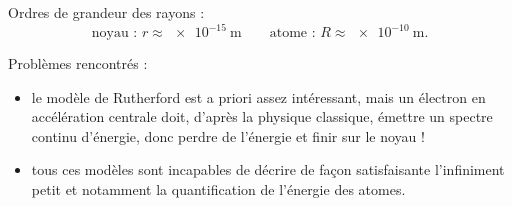 Ordres de grandeur des rayons : \[\text{noyau : }r\approx\SI{e-15}{\meter}\qquad\text{atome : }R\approx\SI{e-10}{\meter}.\]

Problèmes rencontrés :

\begin{itemize}
    \item le modèle de Rutherford est a priori assez intéressant, mais un électron en accélération centrale doit, d'après la physique classique, émettre un spectre continu d'énergie, donc perdre de l'énergie et finir sur le noyau ! \\
    \item tous ces modèles sont incapables de décrire de façon satisfaisante l'infiniment petit et notamment la quantification de l'énergie des atomes.
\end{itemize}